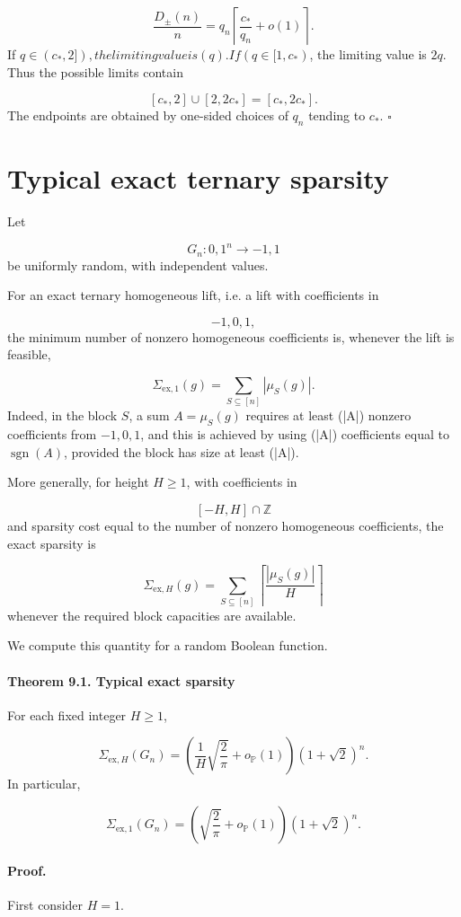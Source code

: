 \documentclass[11pt]{article}
\theoremstyle{definition}
\begin{document}
\[
\frac{D_\pm(n)}n
=
q_n
\left\lceil
\frac{c_*}{q_n}+o(1)
\right\rceil.
\]
If $q\in(c_*,2]), the limiting value is (q). If (q\in[1,c_*)$, the limiting value is $2q$. Thus the possible limits contain

\[
[c_*,2]\cup[2,2c_*]=[c_*,2c_*].
\]
The endpoints are obtained by one-sided choices of $q_n$ tending to $c_*$. $\square$

\section{Typical exact ternary sparsity}
Let

\[
G_n:{0,1}^n\to{-1,1}
\]
be uniformly random, with independent values.

For an exact ternary homogeneous lift, i.e. a lift with coefficients in

\[
{-1,0,1},
\]
the minimum number of nonzero homogeneous coefficients is, whenever the lift is feasible,

\[
\Sigma_{\mathrm{ex},1}(g)
=
\sum_{S\subseteq[n]}|\mu_S(g)|.
\]
Indeed, in the block $S$, a sum $A=\mu_S(g)$ requires at least (|A|) nonzero coefficients from ${-1,0,1}$, and this is achieved by using (|A|) coefficients equal to $\operatorname{sgn}(A)$, provided the block has size at least (|A|).

More generally, for height $H\ge1$, with coefficients in

\[
[-H,H]\cap\mathbb{Z}
\]
and sparsity cost equal to the number of nonzero homogeneous coefficients, the exact sparsity is

\[
\Sigma_{\mathrm{ex},H}(g)
=
\sum_{S\subseteq[n]}
\left\lceil
\frac{|\mu_S(g)|}{H}
\right\rceil
\]
whenever the required block capacities are available.

We compute this quantity for a random Boolean function.

\paragraph{Theorem 9.1. Typical exact sparsity}
For each fixed integer $H\ge1$,

\[
\Sigma_{\mathrm{ex},H}(G_n)
=
\left(
\frac1H\sqrt{\frac2\pi}
+
o_{\mathbb{P}}(1)
\right)
(1+\sqrt2)^n.
\]
In particular,

\[
\Sigma_{\mathrm{ex},1}(G_n)
=
\left(
\sqrt{\frac2\pi}
+
o_{\mathbb{P}}(1)
\right)
(1+\sqrt2)^n.
\]
\paragraph{Proof.}
First consider $H=1$.
\end{document}
